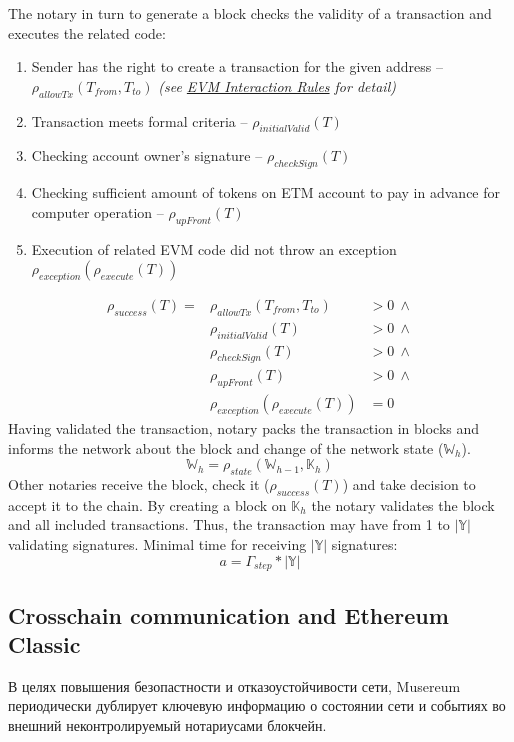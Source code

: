 \documentclass[12pt]{report}
\begin{document}
The notary in turn to generate a block checks the validity of a transaction and executes the related code:
\begin{enumerate}
\item Sender has the right to create a transaction for the given address – $\rho_{allowTx}(T_{from}, T_{to})$ \textit{(see \hyperref[tech-blockchain-rules]{EVM Interaction Rules} for detail)}
\item Transaction meets formal criteria – $\rho_{initialValid}(T)$
\item Checking account owner's signature – $\rho_{checkSign}(T)$
\item Checking sufficient amount of tokens on ETM account to pay in advance for computer operation – $\rho_{upFront}(T)$
\item Execution of related	EVM code	did not 	throw an exception $\rho_{exception}(\rho_{execute}(T))$
\end{enumerate}
\begin{align}
\rho_{success}(T) = 	&\rho_{allowTx}(T_{from}, T_{to}) &> 0 \ \wedge \\
 								&\rho_{initialValid}(T) &> 0 \ \wedge \\
								&\rho_{checkSign}(T) &> 0 \ \wedge \\
								&\rho_{upFront}(T) &> 0 \ \wedge \\
 								&\rho_{exception}(\rho_{execute}(T)) &= 0
\end{align}
Having validated the transaction, notary packs the transaction in blocks and informs the network about the block and change of the network state ($\mathbb{W}_h$).
\begin{equation}
\mathbb{W}_h = \rho_{state}(\mathbb{W}_{h-1}, \mathbb{K}_h)
\end{equation}
Other notaries receive the block, check it ($\rho_{success}(T)$) and take decision to accept it to the chain. By creating a block on $\mathbb{K}_h$ the notary validates the block and all included transactions.
Thus, the transaction may have from 1 to $|\mathbb{Y}|$ validating signatures.
Minimal time for receiving $|\mathbb{Y}|$ signatures:
\begin{equation}
a = \Gamma_{step} * |\mathbb{Y}|
\end{equation}
\vfill\null\pagebreak

\subsection{Crosschain communication and Ethereum Classic}
\label{tech-blockchain-anchoring}
В целях повышения безопастности и отказоустойчивости сети, Musereum периодически дублирует ключевую информацию о состоянии сети и событиях во внешний неконтролируемый нотариусами блокчейн. 
\end{document}
